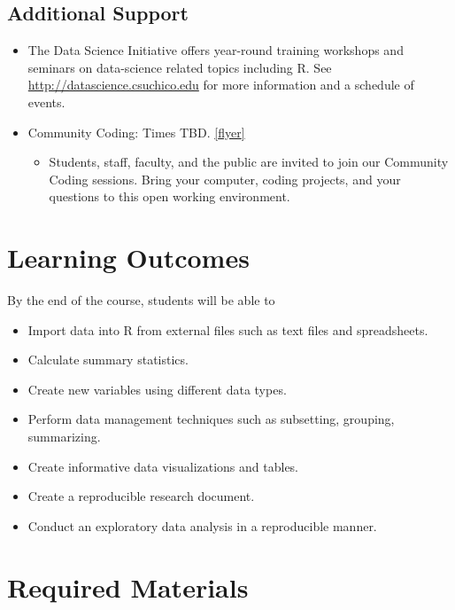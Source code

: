 \documentclass[
  11pt,
]{article}
\providecommand{\tightlist}{%
  \setlength{\itemsep}{0pt}\setlength{\parskip}{0pt}}
\begin{document}
\hypertarget{additional-support}{%
\subsection{Additional Support}\label{additional-support}}

\begin{itemize}
\tightlist
\item
  The Data Science Initiative offers year-round training workshops and
  seminars on data-science related topics including R. See
  \url{http://datascience.csuchico.edu} for more information and a
  schedule of events.
\item
  Community Coding: Times TBD. \href{bit.ly/cc_hours}{{[}flyer{]}}

  \begin{itemize}
  \tightlist
  \item
    Students, staff, faculty, and the public are invited to join our
    Community Coding sessions. Bring your computer, coding projects, and
    your questions to this open working environment.
  \end{itemize}
\end{itemize}

\hypertarget{learning-outcomes}{%
\section{Learning Outcomes}\label{learning-outcomes}}

By the end of the course, students will be able to

\begin{itemize}
\tightlist
\item
  Import data into R from external files such as text files and
  spreadsheets.
\item
  Calculate summary statistics.
\item
  Create new variables using different data types.
\item
  Perform data management techniques such as subsetting, grouping,
  summarizing.
\item
  Create informative data visualizations and tables.
\item
  Create a reproducible research document.
\item
  Conduct an exploratory data analysis in a reproducible manner.
\end{itemize}

\hypertarget{required-materials}{%
\section{Required Materials}\label{required-materials}}
\end{document}
